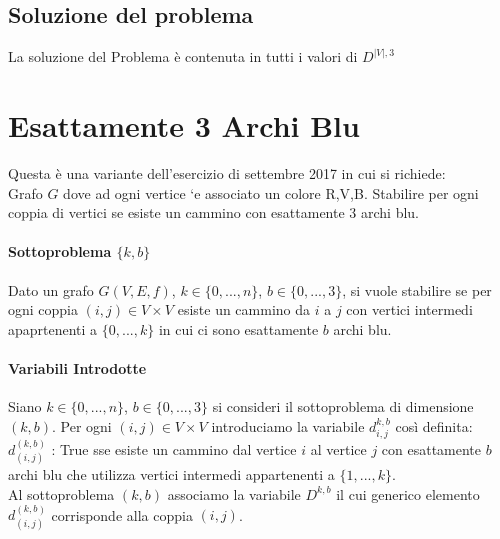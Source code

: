 \documentclass[12pt, a4paper, openany]{book}
\begin{document}
\subsection*{Soluzione del problema}
La soluzione del Problema è contenuta in tutti i valori di $D^{|V|,3}$

\section{Esattamente 3 Archi Blu}
Questa è una variante dell'esercizio di settembre 2017 in cui si richiede:
\\Grafo $G$ dove ad ogni vertice `e associato un colore R,V,B. Stabilire per ogni
coppia di vertici se esiste un cammino con esattamente 3 archi blu.
\paragraph*{Sottoproblema $\{k,b\}$}
Dato un grafo $G(V,E,f)$, $k\in \{0,...,n\}$, $b\in \{0,...,3\}$, si vuole stabilire se per ogni coppia $(i,j)\in V\times V$
esiste un cammino da $i$ a $j$ con vertici intermedi apaprtenenti a $\{0,...,k\}$ in cui ci sono esattamente $b$ archi blu.

\paragraph*{Variabili Introdotte}
Siano $k\in \{0,...,n\}$, $b\in \{0,...,3\}$ si consideri il sottoproblema di dimensione $(k,b)$.
Per ogni $(i,j)\in V\times V$ introduciamo la variabile $d_{i,j}^{k,b}$ così definita:
\\$d_{(i,j)}^{(k,b)}$ : True sse esiste un cammino dal vertice $i$ al vertice $j$ con esattamente $b$ archi blu
	che utilizza vertici intermedi appartenenti a $\{1,...,k\}$.
	\\Al sottoproblema $(k,b)$ associamo la variabile $D^{k,b}$ il cui generico elemento $d^{(k,b)}_{(i,j)}$ corrisponde alla coppia $(i,j)$.
\end{document}
